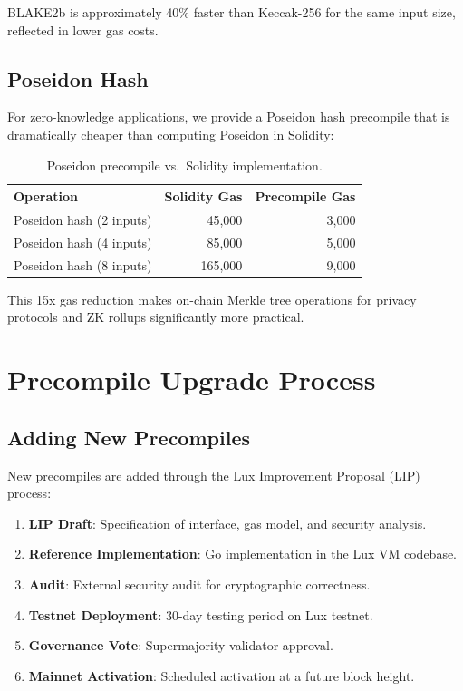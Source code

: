 \documentclass[11pt,a4paper]{article}
\begin{document}
BLAKE2b is approximately 40\% faster than Keccak-256 for the same input size, reflected in lower gas costs.

\subsection{Poseidon Hash}

For zero-knowledge applications, we provide a Poseidon hash precompile that is dramatically cheaper than computing Poseidon in Solidity:

\begin{table}[H]
\centering
\caption{Poseidon precompile vs.\ Solidity implementation.}
\label{tab:poseidon}
\begin{tabular}{lrr}
\toprule
\textbf{Operation} & \textbf{Solidity Gas} & \textbf{Precompile Gas} \\
\midrule
Poseidon hash (2 inputs) & 45,000 & 3,000 \\
Poseidon hash (4 inputs) & 85,000 & 5,000 \\
Poseidon hash (8 inputs) & 165,000 & 9,000 \\
\bottomrule
\end{tabular}
\end{table}

This 15x gas reduction makes on-chain Merkle tree operations for privacy protocols and ZK rollups significantly more practical.

\section{Precompile Upgrade Process}\label{sec:upgrade}

\subsection{Adding New Precompiles}

New precompiles are added through the Lux Improvement Proposal (LIP) process:

\begin{enumerate}
    \item \textbf{LIP Draft}: Specification of interface, gas model, and security analysis.
    \item \textbf{Reference Implementation}: Go implementation in the Lux VM codebase.
    \item \textbf{Audit}: External security audit for cryptographic correctness.
    \item \textbf{Testnet Deployment}: 30-day testing period on Lux testnet.
    \item \textbf{Governance Vote}: Supermajority validator approval.
    \item \textbf{Mainnet Activation}: Scheduled activation at a future block height.
\end{enumerate}
\end{document}
